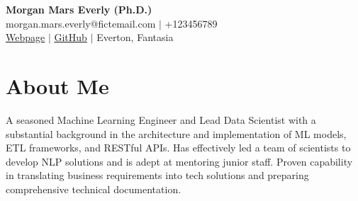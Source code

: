 \documentclass[a4paper,10pt]{article}
\begin{document}
\begin{center}
    \Huge \textbf{ Morgan Mars Everly (Ph.D.) } \\
    \vspace{0.2cm}
    \normalsize
    morgan.mars.everly@fictemail.com \quad $|$ \quad +123456789 \\
    \href{\detokenize{ https://morganmarseverly.ai }}{Webpage} \quad $|$
    \href{\detokenize{ https://github.com/morganmarseverly }}{GitHub} \quad $|$
    Everton, Fantasia \\
    \vspace{0.8cm}
\end{center}

\section*{About Me}
A seasoned Machine Learning Engineer and Lead Data Scientist with a substantial background in the architecture and implementation of ML models, ETL frameworks, and RESTful APIs. Has effectively led a team of scientists to develop NLP solutions and is adept at mentoring junior staff. Proven capability in translating business requirements into tech solutions and preparing comprehensive technical documentation.
\vspace{0.5em}
\end{document}
